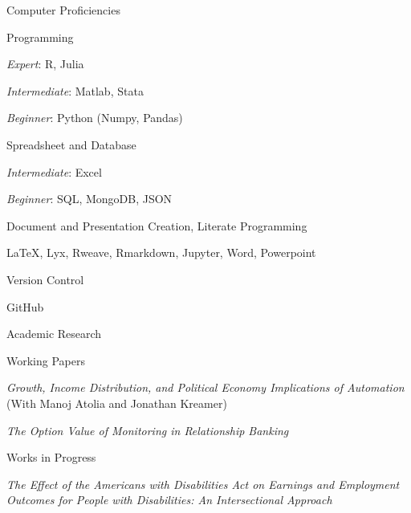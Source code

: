 \documentclass{resume} %
\begin{document}

\begin{rSection}{Computer Proficiencies}

\begin{rSubsection}{Programming}{}{}{}
    \item {\em Expert}: R, Julia
    \item {\em Intermediate}: Matlab, Stata 
    \item {\em Beginner}: Python (Numpy, Pandas)
\end{rSubsection}

\begin{rSubsection}{Spreadsheet and Database}{}{}{}
    \item {\em Intermediate}: Excel 
    \item {\em Beginner}: SQL, MongoDB, JSON
\end{rSubsection}

\begin{rSubsection}{Document and Presentation Creation, Literate Programming}{}{}{}
    \item \LaTeX, Lyx, Rweave, Rmarkdown, Jupyter, Word, Powerpoint
\end{rSubsection}

\begin{rSubsection}{Version Control}{}{}{}
    \item GitHub
\end{rSubsection}

\end{rSection}

\begin{rSection}{Academic Research}

\begin{rSubsection}{Working Papers}{}{}{}
    \item {\em Growth, Income Distribution, and Political Economy Implications of Automation} (With Manoj Atolia and Jonathan Kreamer)
    \item {\em The Option Value of Monitoring in Relationship Banking}
\end{rSubsection}

\begin{rSubsection}{Works in Progress}{}{}{}
    \item {\em The Effect of the Americans with Disabilities Act on Earnings and Employment Outcomes for People with Disabilities: An Intersectional Approach}
\end{rSubsection}

\end{rSection}
\end{document}
